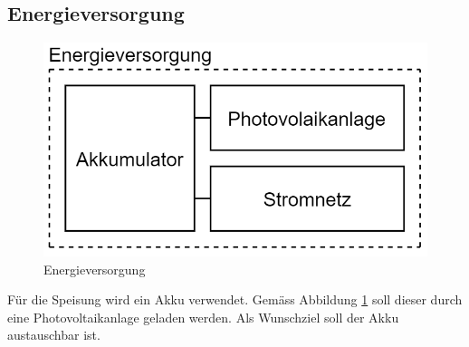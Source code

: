 \subsection{Energieversorgung}
\begin{figure}[h]
\centering
\includegraphics[scale=0.6]{graphics/Energieversorgung.PNG}
\caption{Energieversorgung}
\label{fig:Energieversorgung}
\end{figure}

Für die Speisung wird ein Akku verwendet. Gemäss Abbildung \ref{fig:Energieversorgung} soll dieser durch eine Photovoltaikanlage geladen werden. Als Wunschziel soll der Akku austauschbar ist.\\